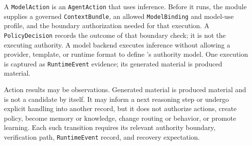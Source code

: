 \documentclass[11pt]{report}
\begin{document}
A \texttt{ModelAction} is an \texttt{AgentAction} that uses inference. Before it runs, the module supplies a governed \texttt{ContextBundle}, an allowed \texttt{ModelBinding} and model-use profile, and the boundary authorization needed for that execution. A \texttt{PolicyDecision} records the outcome of that boundary check; it is not the executing authority. A model backend executes inference without allowing a provider, template, or runtime format to define \Madre's authority model. One execution is captured as \texttt{RuntimeEvent} evidence; its generated material is produced material.

Action results may be observations. Generated material is produced material and is not a candidate by itself. It may inform a next reasoning step or undergo explicit handling into another record, but it does not authorize actions, create policy, become memory or knowledge, change routing or behavior, or promote learning. Each such transition requires its relevant authority boundary, verification path, \texttt{RuntimeEvent} record, and recovery expectation.

 \usetikzlibrary{positioning,fit,backgrounds,arrows.meta,calc}
\end{document}
